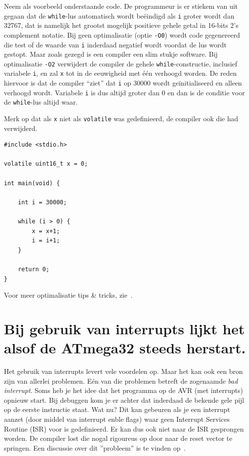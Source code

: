 \documentclass[12pt,a4paper,final,twoside,fleqn]{article}
\def\lstC{\lstinline[style=C]}
\begin{document}
Neem als voorbeeld onderstaande code. De programmeur is er stiekem van uit gegaan dat
de \lstC{while}-lus automatisch wordt be\"{e}indigd als \lstC{i} groter wordt dan
32767, dat is namelijk het grootst mogelijk positieve gehele getal in 16-bits
2's complement notatie. Bij geen optimalisatie (optie \lstC{-O0}) wordt code
gegenereerd die test of de waarde van \lstC{i} inderdaad negatief wordt voordat
de lus wordt gestopt. Maar zoals gezegd is een compiler een slim stukje software.
Bij optimalisatie \lstC{-O2} verwijdert de compiler de gehele \lstC{while}-constructie,
inclusief variabele \lstC{i}, en zal \lstC{x} tot in de eeuwigheid met \'{e}\'{e}n
verhoogd worden. De reden hiervoor is dat de compiler ``ziet'' dat \lstC{i} op 30000
wordt ge\"{i}nitialiseerd en alleen verhoogd wordt. Variabele \lstC{i} is dus altijd
groter dan 0 en dan is de conditie voor de \lstC{while}-lus altijd waar.

Merk op dat als \lstC{x} niet als \lstC{volatile} was gedefinieerd, de compiler
ook die had verwijderd.

\begin{lstlisting}[style=C,caption=Code met impliciet testen]
#include <stdio.h>

volatile uint16_t x = 0;

int main(void) {

    int i = 30000;

    while (i > 0) {
		x = x+1;
		i = i+1;
    }
    
    return 0;
}
\end{lstlisting}

Voor meer optimalisatie tips \& tricks, zie~\cite{atmega32doc8453}.


\section{Bij gebruik van interrupts lijkt het alsof de ATmega32 steeds herstart.}
Het gebruik van interrupts levert vele voordelen op. Maar het kan ook een bron zijn van
allerlei problemen. E\'{e}n van die problemen betreft de zogenaamde \textsl{bad interrupt}.
Soms heb je het idee dat het programma op de AVR (met interrupts) opnieuw start. Bij debuggen
kom je er achter dat inderdaad de bekende gele pijl op de eerste instructie staat. Wat nu?
Dit kan gebeuren als je een interrupt aanzet (door middel van interrupt enble flags) waar
geen Interrupt Services Routine (ISR) voor is gedefinieerd. Er kan dus ook niet naar de ISR
gesprongen worden. De compiler lost die nogal rigoureus op door naar de reset vector te
springen. Een discussie over dit ''probleem'' is te vinden op~\cite{savannah7546}.
\end{document}
